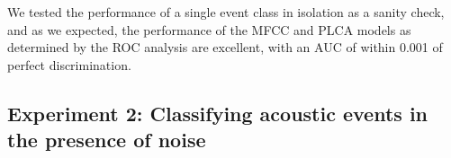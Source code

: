 \documentclass[a4paper,10pt,final]{ThesisStyle}
\begin{document}
We tested the performance of a single event class in isolation as a sanity check, and as we expected, the performance of the MFCC and PLCA models as determined by the ROC analysis are excellent, with an AUC of within 0.001 of perfect discrimination.




\subsection{Experiment 2: Classifying acoustic events in the presence of noise}
\end{document}
